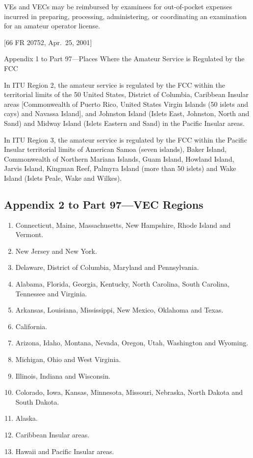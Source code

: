 \documentclass[
  letterpaper,
  DIV=11,
  numbers=noendperiod]{scrreport}
\providecommand{\tightlist}{%
  \setlength{\itemsep}{0pt}\setlength{\parskip}{0pt}}\usepackage{longtable,booktabs,array}
\begin{document}
VEs and VECs may be reimbursed by examinees for out-of-pocket expenses
incurred in preparing, processing, administering, or coordinating an
examination for an amateur operator license.

{[}66 FR 20752, Apr.~25, 2001{]}

Appendix 1 to Part 97---Places Where the Amateur Service is Regulated by
the FCC

In ITU Region 2, the amateur service is regulated by the FCC within the
territorial limits of the 50 United States, District of Columbia,
Caribbean Insular areas {[}Commonwealth of Puerto Rico, United States
Virgin Islands (50 islets and cays) and Navassa Island{]}, and Johnston
Island (Islets East, Johnston, North and Sand) and Midway Island (Islets
Eastern and Sand) in the Pacific Insular areas.

In ITU Region 3, the amateur service is regulated by the FCC within the
Pacific Insular territorial limits of American Samoa (seven islands),
Baker Island, Commonwealth of Northern Mariana Islands, Guam Island,
Howland Island, Jarvis Island, Kingman Reef, Palmyra Island (more than
50 islets) and Wake Island (Islets Peale, Wake and Wilkes).

\hypertarget{appendix-2-to-part-97vec-regions}{%
\subsection*{Appendix 2 to Part 97---VEC
Regions}\label{appendix-2-to-part-97vec-regions}}

\begin{enumerate}
\def\labelenumi{\arabic{enumi}.}
\tightlist
\item
  Connecticut, Maine, Massachusetts, New Hampshire, Rhode Island and
  Vermont.
\item
  New Jersey and New York.
\item
  Delaware, District of Columbia, Maryland and Pennsylvania.
\item
  Alabama, Florida, Georgia, Kentucky, North Carolina, South Carolina,
  Tennessee and Virginia.
\item
  Arkansas, Louisiana, Mississippi, New Mexico, Oklahoma and Texas.
\item
  California.
\item
  Arizona, Idaho, Montana, Nevada, Oregon, Utah, Washington and Wyoming.
\item
  Michigan, Ohio and West Virginia.
\item
  Illinois, Indiana and Wisconsin.
\item
  Colorado, Iowa, Kansas, Minnesota, Missouri, Nebraska, North Dakota
  and South Dakota.
\item
  Alaska.
\item
  Caribbean Insular areas.
\item
  Hawaii and Pacific Insular areas.
\end{enumerate}
\end{document}
